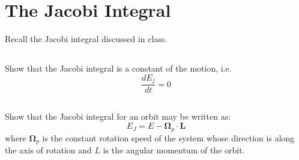 \section{The Jacobi Integral}

Recall the Jacobi integral discussed in class.
\subsection{}
Show that the Jacobi integral is a constant of the motion, i.e.
\begin{equation}
    \frac{dE_j}{dt}=0
\end{equation}





\subsection{}

Show that the Jacobi integral for an orbit may be written as:
\begin{equation}
    E_J = E - \mathbf{\Omega}_p \cdot \mathbf{L}
\end{equation}
where $\mathbf{\Omega}_p$ is the constant rotation speed of the system whose direction is along the axis of rotation and $L$ is the angular momentum of the orbit.

\clearpage